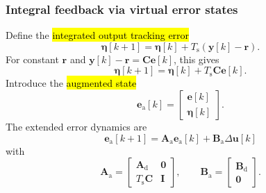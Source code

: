 \begin{frame}
	\frametitle{Integral feedback via virtual error states}
	Define the \hl{integrated output tracking error}
	\begin{equation}
		\bm{\eta}[k+1]=\bm{\eta}[k]+T_{\mathrm{s}}\left(\bm{y}[k]-\bm{r}\right).
	\end{equation}\pause%
	For constant $\bm{r}$ and $\bm{y}[k]-\bm{r}=\bm{C}\bm{e}[k]$, this gives
	\begin{equation}
		\bm{\eta}[k+1]=\bm{\eta}[k]+T_{\mathrm{s}}\bm{C}\bm{e}[k].
	\end{equation}\pause%
	Introduce the \hl{augmented state}
	\begin{equation}
		\bm{e}_{\mathrm{a}}[k]
		=\begin{bmatrix}\bm{e}[k]\\\bm{\eta}[k]\end{bmatrix}.
	\end{equation}\pause%
	The extended error dynamics are
	\begin{equation}
		\boxed{\bm{e}_{\mathrm{a}}[k+1]
			=\bm{A}_{\mathrm{a}}\bm{e}_{\mathrm{a}}[k]+\bm{B}_{\mathrm{a}}\Delta\bm{u}[k]}
	\end{equation}\pause%
	with
	\begin{equation}
		\bm{A}_{\mathrm{a}}=\begin{bmatrix}
			\bm{A}_{\mathrm{d}}  & \bm{0} \\
			T_{\mathrm{s}}\bm{C} & \bm{I}
		\end{bmatrix},
		\qquad
		\bm{B}_{\mathrm{a}}=\begin{bmatrix}
			\bm{B}_{\mathrm{d}} \\
			\bm{0}
		\end{bmatrix}.
	\end{equation}
\end{frame}


